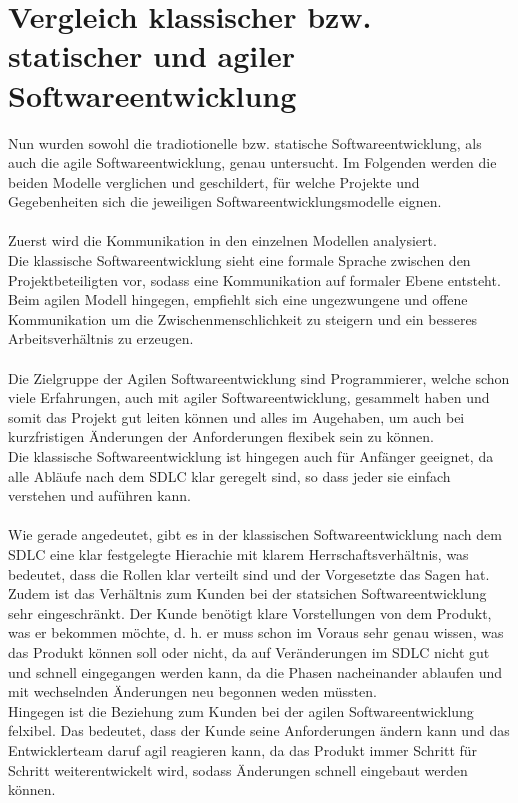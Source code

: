 \documentclass[a4paper, 10pt]{scrartcl}
\begin{document}
\section{Vergleich klassischer bzw. statischer und agiler Softwareentwicklung}
Nun wurden sowohl die tradiotionelle bzw. statische Softwareentwicklung, als auch die agile Softwareentwicklung, genau untersucht. Im Folgenden werden die beiden Modelle verglichen und geschildert, für welche Projekte und Gegebenheiten sich die jeweiligen Softwareentwicklungsmodelle eignen.\\\\
Zuerst wird die Kommunikation in den einzelnen Modellen analysiert.\\
Die klassische Softwareentwicklung sieht eine formale Sprache zwischen den Projektbeteiligten vor, sodass eine Kommunikation auf formaler Ebene entsteht.\\
Beim agilen Modell hingegen, empfiehlt sich eine ungezwungene und offene Kommunikation um die Zwischenmenschlichkeit zu steigern und ein besseres Arbeitsverhältnis zu erzeugen.\\\\
Die Zielgruppe der Agilen Softwareentwicklung sind Programmierer, welche schon viele Erfahrungen, auch mit agiler Softwareentwicklung, gesammelt haben und somit das Projekt gut leiten können und alles \glqq im Auge\grqq haben, um auch bei kurzfristigen Änderungen der Anforderungen flexibek sein zu können.\\
Die klassische Softwareentwicklung ist hingegen auch für Anfänger geeignet, da alle Abläufe nach dem SDLC klar geregelt sind, so dass jeder sie einfach verstehen und auführen kann.\\\\
Wie gerade angedeutet, gibt es in der klassischen Softwareentwicklung nach dem SDLC eine klar festgelegte Hierachie mit klarem \glqq Herrschaftsverhältnis\grqq{}, was bedeutet, dass die Rollen klar verteilt sind und der Vorgesetzte \glqq das Sagen\grqq{} hat.\\
Zudem ist das Verhältnis zum Kunden bei der statsichen Softwareentwicklung sehr eingeschränkt. Der Kunde benötigt klare Vorstellungen von dem Produkt, was er bekommen möchte, d. h. er muss schon im Voraus sehr genau wissen, was das Produkt können soll oder nicht, da auf Veränderungen im SDLC nicht gut und schnell eingegangen werden kann, da die Phasen nacheinander ablaufen und mit wechselnden Änderungen neu begonnen weden müssten.\\
Hingegen ist die Beziehung zum Kunden bei der agilen Softwareentwicklung felxibel. Das bedeutet, dass der Kunde seine Anforderungen ändern kann und das Entwicklerteam daruf agil reagieren kann, da das Produkt immer Schritt für Schritt weiterentwickelt wird, sodass Änderungen schnell eingebaut werden können.\\\\
\end{document}
